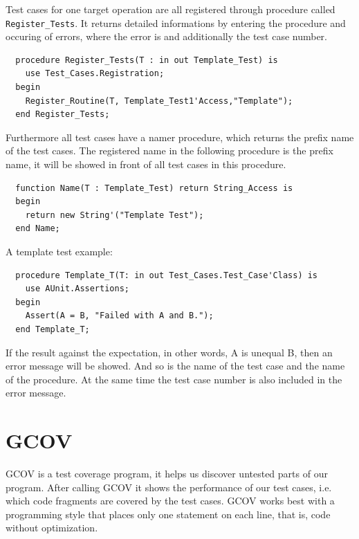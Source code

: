 Test cases for one target operation are all registered through
procedure called \texttt{Register\_\-Tests}. It returns detailed
informations by entering the procedure and occuring of errors, where
the error is and additionally the test case number.
\begin{lstlisting}
  procedure Register_Tests(T : in out Template_Test) is
    use Test_Cases.Registration;
  begin
    Register_Routine(T, Template_Test1'Access,"Template");
  end Register_Tests;
\end{lstlisting}
Furthermore all test cases have a namer procedure, which returns the
prefix name of the test cases. The registered name in the following
procedure is the prefix name, it will be showed in front of all test
cases in this procedure.
\begin{lstlisting}
  function Name(T : Template_Test) return String_Access is
  begin
	return new String'("Template Test");
  end Name;
\end{lstlisting}
A template test example:
\begin{lstlisting}
  procedure Template_T(T: in out Test_Cases.Test_Case'Class) is
    use AUnit.Assertions;
  begin
    Assert(A = B, "Failed with A and B.");
  end Template_T;
\end{lstlisting}
If the result against the expectation, in other words, A is unequal B,
then an error message will be showed. And so is the name of the test
case and the name of the procedure. At the same time the test case
number is also included in the error message.

\section{GCOV}
GCOV is a test coverage program, it helps us discover untested parts
of our program. After calling GCOV it shows the performance of our
test cases, i.e. which code fragments are covered by the test
cases. GCOV works best with a programming style that places only one
statement on each line, that is, code without optimization.

